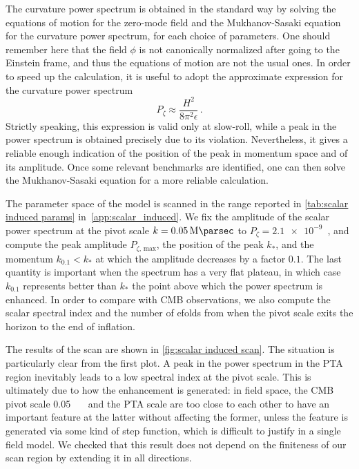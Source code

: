 \documentclass{article}
\begin{document}
The curvature power spectrum is obtained in the standard way by solving the equations of motion for the zero-mode field and the Mukhanov-Sasaki equation for the curvature power spectrum, for each choice of parameters. One should remember here that the field $\phi$ is not canonically normalized after going to the Einstein frame, and thus the equations of motion are not the usual ones.
In order to speed up the calculation, it is useful to adopt the approximate expression for the curvature power spectrum
\begin{equation}\label{eq:scalar PS SR}
P_\zeta \approx \frac{H^2}{8\pi^2 \epsilon} \,.    
\end{equation}
Strictly speaking, this expression is valid only at slow-roll, while a peak in the power spectrum is obtained precisely due to its violation. Nevertheless, it gives a reliable enough indication of the position of the peak in momentum space and of its amplitude. Once some relevant benchmarks are identified, one can then solve the Mukhanov-Sasaki equation for a more reliable calculation.

The parameter space of the model is scanned in the range reported in \cref{tab:scalar induced params} in~\cref{app:scalar_induced}.
We fix the amplitude of the scalar power spectrum at the pivot scale $k=\SI{0.05}{\per\mega\parsec}$ to $P_\zeta = \num{2.1e-9}$~\cite{Planck:2018vyg}, and compute the peak amplitude $P_{\zeta,\,\mathrm{max}}$, the position of the peak $k_*$, and the momentum $k_{0.1} < k_*$ at which the amplitude decreases by a factor $0.1$. The last quantity is important when the spectrum has a very flat plateau, in which case $k_{0.1}$ represents better than $k_*$ the point above which the power spectrum is enhanced. In order to compare with CMB observations, we also compute the scalar spectral index and the number of efolds from when the pivot scale exits the horizon to the end of inflation.

The results of the scan are shown in \cref{fig:scalar induced scan}.
The situation is particularly clear from the first plot. A peak in the power spectrum in the PTA region inevitably leads to a low spectral index at the pivot scale. This is ultimately due to how the enhancement is generated: in field space, the CMB pivot scale \SI{0.05}{\per\mega\parsec} and the PTA scale are too close to each other to have an important feature at the latter without affecting the former, unless the feature is generated via some kind of step function, which is difficult to justify in a single field model. We checked that this result does not depend on the finiteness of our scan region by extending it in all directions.
\end{document}
